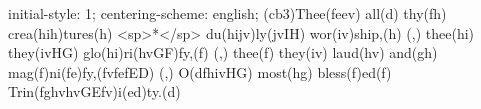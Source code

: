 initial-style: 1;
centering-scheme: english;
(cb3)Thee(feev) all(d) thy(fh) crea(hih)tures(h) <sp>*</sp> du(hijv)ly(jvIH) wor(iv)ship,(h) (,) thee(hi) they(ivHG) glo(hi)ri(hvGF)fy,(f) (,) thee(f) they(iv) laud(hv) and(gh) mag(f)ni(fe)fy,(fvfefED) (,) O(dfhivHG) most(hg) bless(f)ed(f) Trin(fghvhvGEfv)i(ed)ty.(d)
